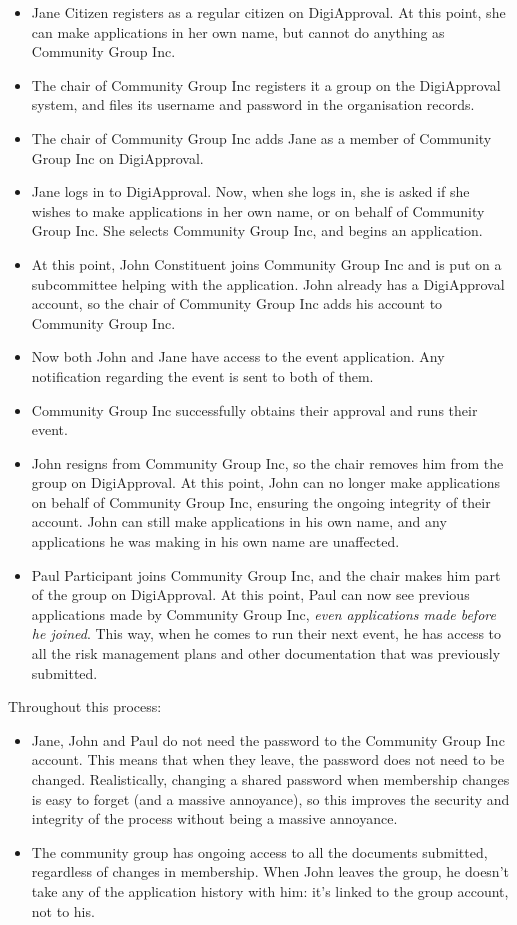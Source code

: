 \documentclass[12pt,a4paper,twosided]{article}
\begin{document}
\begin{itemize}
\item Jane Citizen registers as a regular citizen on DigiApproval. At this point, she can make applications in her own name, but cannot do anything as Community Group Inc.
\item The chair of Community Group Inc registers it a group on the DigiApproval system, and files its username and password in the organisation records.
\item The chair of Community Group Inc adds Jane as a member of Community Group Inc on DigiApproval.
\item Jane logs in to DigiApproval. Now, when she logs in, she is asked if she wishes to make applications in her own name, or on behalf of Community Group Inc. She selects Community Group Inc, and begins an application.
\item At this point, John Constituent joins Community Group Inc and is put on a subcommittee helping with the application. John already has a DigiApproval account, so the chair of Community Group Inc adds his account to Community Group Inc.
\item Now both John and Jane have access to the event application. Any notification regarding the event is sent to both of them.
\item Community Group Inc successfully obtains their approval and runs their event.
\item John resigns from Community Group Inc, so the chair removes him from the group on DigiApproval. At this point, John can no longer make applications on behalf of Community Group Inc, ensuring the ongoing integrity of their account. John can still make applications in his own name, and any applications he was making in his own name are unaffected.
\item Paul Participant joins Community Group Inc, and the chair makes him part of the group on DigiApproval. At this point, Paul can now see previous applications made by Community Group Inc, \emph{even applications made before he joined}. This way, when he comes to run their next event, he has access to all the risk management plans and other documentation that was previously submitted.
\end{itemize}

Throughout this process:
\begin{itemize}
\item Jane, John and Paul do not need the password to the Community Group Inc account. This means that when they leave, the password does not need to be changed. Realistically, changing a shared password when membership changes is easy to forget (and a massive annoyance), so this improves the security and integrity of the process without being a massive annoyance.
\item The community group has ongoing access to all the documents submitted, regardless of changes in membership. When John leaves the group, he doesn't take any of the application history with him: it's linked to the group account, not to his.
\end{itemize}
\end{document}
